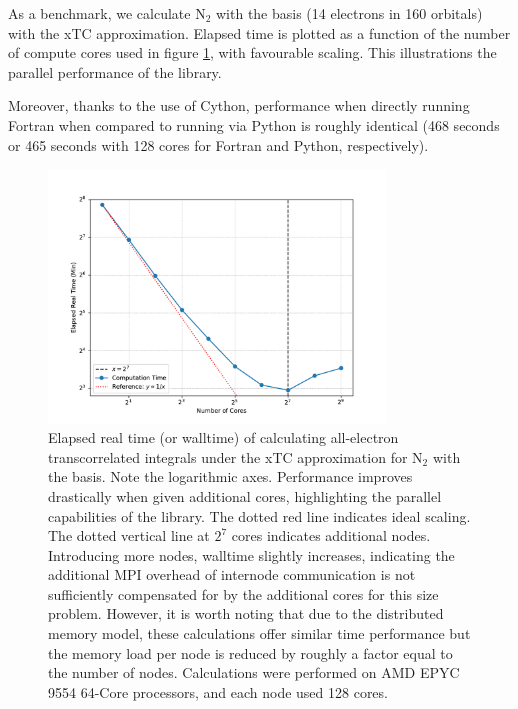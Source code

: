 As a benchmark, we calculate N$_2$ with the \avqz basis (14 electrons in 160 orbitals) with the \gls{xTC} approximation. Elapsed time is plotted as a function of the number of compute cores used in figure \ref{fig:parallel-performance}, with favourable scaling. This illustrations the parallel performance of the \pytchint library.

Moreover, thanks to the use of Cython, performance when directly running Fortran when compared to running via Python is roughly identical (468 seconds or 465 seconds with 128 cores for Fortran and Python, respectively).

\begin{figure}[htbp]
    \centering
    \includegraphics[width=0.8\textwidth]{figures/pytchint/ncore_walltime}
    \caption{Elapsed real time (or walltime) of calculating all-electron transcorrelated integrals under the \gls{xTC} approximation for N$_2$ with the \avqz basis. Note the logarithmic axes. Performance improves drastically when given additional cores, highlighting the parallel capabilities of the \pytchint library. The dotted red line indicates ideal scaling. The dotted vertical line at $2^7$ cores indicates additional nodes. Introducing more nodes, walltime slightly increases, indicating the additional MPI overhead of internode communication is not sufficiently compensated for by the additional cores for this size problem. However, it is worth noting that due to the distributed memory model, these calculations offer similar time performance but the memory load per node is reduced by roughly a factor equal to the number of nodes. Calculations were performed on AMD EPYC 9554 64-Core processors, and each node used 128 cores.}
    \label{fig:parallel-performance}
\end{figure}

